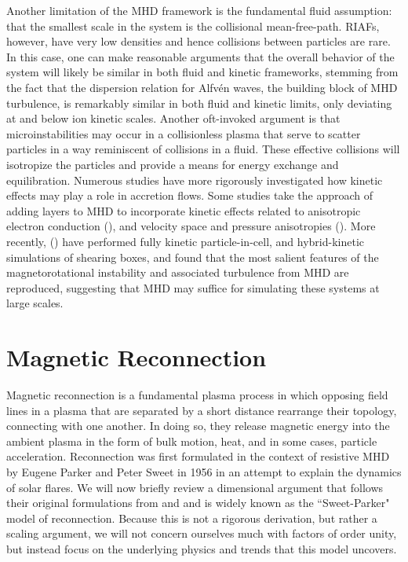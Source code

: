Another limitation of the MHD framework is the fundamental fluid assumption: that the smallest scale in the system is the collisional mean-free-path.  RIAFs, however, have very low densities and hence collisions between particles are rare.  In this case, one can make reasonable arguments that the overall behavior of the system will likely be similar in both fluid and kinetic frameworks, stemming from the fact that the dispersion relation for Alfv\'en waves, the building block of MHD turbulence, is remarkably similar in both fluid and kinetic limits, only deviating at and below ion kinetic scales.  Another oft-invoked argument is that microinstabilities may occur in a collisionless plasma that serve to scatter particles in a way reminiscent of collisions in a fluid.  These effective collisions will isotropize the particles and provide a means for energy exchange and equilibration.  Numerous studies have more rigorously investigated how kinetic effects may play a role in accretion flows.  Some studies take the approach of adding layers to MHD to incorporate kinetic effects related to anisotropic electron conduction (\citealt{ressler2015, ressler2016}), and velocity space and pressure anisotropies (\citealt{sharma2006}).  More recently, (\citealt{riquelme2012, kunz2016}) have performed fully kinetic particle-in-cell, and hybrid-kinetic simulations of shearing boxes, and found that the most salient features of the magnetorotational instability and associated turbulence from MHD are reproduced, suggesting that MHD may suffice for simulating these systems at large scales.

\section{Magnetic Reconnection}
\label{sec:mag_recon}
Magnetic reconnection is a fundamental plasma process in which opposing field lines in a plasma that are separated by a short distance rearrange their topology, connecting with one another.  In doing so, they release magnetic energy into the ambient plasma in the form of bulk motion, heat, and in some cases, particle acceleration.  Reconnection was first formulated in the context of resistive MHD by Eugene Parker and Peter Sweet in 1956 in an attempt to explain the dynamics of solar flares.  We will now briefly review a dimensional argument that follows their original formulations from \citet{parker1957} and \cite{sweet1958} and is widely known as the ``Sweet-Parker" model of reconnection.  Because this is not a rigorous derivation, but rather a scaling argument, we will not concern ourselves much with factors of order unity, but instead focus on the underlying physics and trends that this model uncovers.

